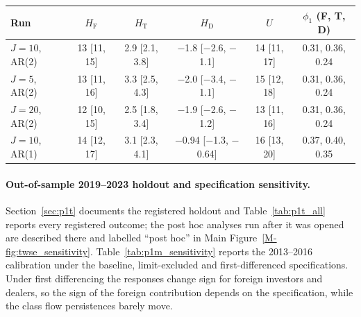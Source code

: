 \documentclass[12pt]{article}
\theoremstyle{definition}
\theoremstyle{remark}
\begin{document}
\begin{center}\footnotesize\setlength{\tabcolsep}{4pt}
\begin{tabular}{lccccc}\toprule
Run & $H_{\mathrm F}$ & $H_{\mathrm T}$ & $H_{\mathrm D}$ & $U$ & $\phi_1$ (F, T, D)\\\midrule
$J=10$, AR(2) & 13 [11, 15] & 2.9 [2.1, 3.8] & $-$1.8 [$-$2.6, $-$1.1] & 14 [11, 17] & 0.31, 0.36, 0.24\\
$J=5$, AR(2) & 13 [11, 16] & 3.3 [2.5, 4.3] & $-$2.0 [$-$3.4, $-$1.1] & 15 [12, 18] & 0.31, 0.36, 0.24\\
$J=20$, AR(2) & 12 [10, 15] & 2.5 [1.8, 3.4] & $-$1.9 [$-$2.6, $-$1.2] & 13 [11, 16] & 0.31, 0.36, 0.24\\
$J=10$, AR(1) & 14 [12, 17] & 3.1 [2.3, 4.1] & $-$0.94 [$-$1.3, $-$0.64] & 16 [13, 20] & 0.37, 0.40, 0.35\\
\bottomrule\end{tabular}
\end{center}

\paragraph{Out-of-sample 2019--2023 holdout and specification sensitivity.} Section~\ref{sec:p1t} documents the registered holdout and Table~\ref{tab:p1t_all} reports every registered outcome; the post hoc analyses run after it was opened are described there and labelled ``post hoc'' in Main Figure~\ref{M-fig:twse_sensitivity}. Table~\ref{tab:p1m_sensitivity} reports the 2013--2016 calibration under the baseline, limit-excluded and first-differenced specifications. Under first differencing the responses change sign for foreign investors and dealers, so the sign of the foreign contribution depends on the specification, while the class flow persistences barely move.
\end{document}
